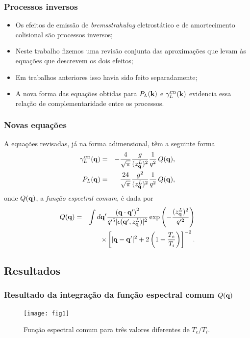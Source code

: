 \documentclass[10pt,aspectratio=1610,lualatex]{beamer}
\begin{document}
\begin{frame}
  \frametitle{Processos inversos}
  \begin{itemize}
  \item Os efeitos de emissão de \emph{bremsstrahulng} eletrostático e
    de amortecimento colisional são processos inversos;
    \vspace{0.4cm}
    \pause
  \item Neste trabalho fizemos uma revisão conjunta das aproximações
    que levam às equações que descrevem os dois efeitos;
    \vspace{0.4cm}
    \pause
  \item Em trabalhos anteriores isso havia sido feito separadamente;
    \vspace{0.4cm}
    \pause
  \item A nova forma das equações obtidas para $P_L({\bf k})$ e
    $\gamma_L^{\mbox{\tiny CD}}({\bf k})$ evidencia essa relação de
    complementaridade entre os processos.
  \end{itemize}
\end{frame}

\begin{frame}
  \frametitle{Novas equações}
  A equações revisadas, já na forma adimensional, têm a seguinte
  forma
  \begin{eqnarray}
    \gamma_L^{\mbox{\tiny CD}}({\bf q})
    &=& -\frac{4}{\sqrt{\pi}}\frac{g}{(z_{\bf q}^L)^2}
        \frac{1}{q^2}\,Q({\bf q}),\nonumber\\
   P_L({\bf q})
   &=& \frac{24}{\sqrt{\pi}}\frac{{g}^2}{(z_{\bf q}^L)^2}
       \frac{1}{q^2}\,Q({\bf q}),\nonumber
  \end{eqnarray}
  onde $Q({\bf q})$, a \emph{função espectral comum}, é dada por
  \begin{eqnarray}
  Q({\bf q})
  &=&\int d{\bf q'}
      \frac{\left({\bf q}\cdot{\bf q'}\right)^2}{q'^5|\epsilon
      ({\bf q'}, z_{\bf q}^L)|^2}
      \exp \left(-\frac{(z_{\bf q}^L)^2}{q'^2}\right)\nonumber\\
    && \times\left[|{\bf q -q'}|^2
       +2\left(1+\frac{T_e}{T_i}\right)\right]^{-2}.\nonumber
\end{eqnarray}
\end{frame}
\subsection*{Resultados}
\begin{frame}
  \frametitle{Resultado da integração da função espectral comum $Q({\bf q})$}
  \begin{figure}
    \centering
    \texttt{[image: fig1]}
    \caption*{Função espectral comum para três valores diferentes de $T_e/T_i$.}
  \end{figure}
\end{frame}
\end{document}

